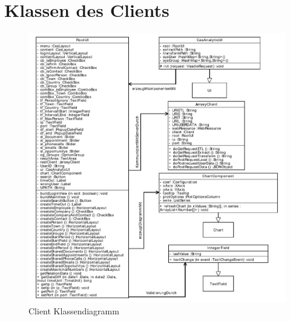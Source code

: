 \section{Klassen des Clients}

\begin{figure}[htbp]
\begin{center}
\includegraphics[width=1.0\textwidth]{pics/ClientKlassendiagramm.pdf}
\caption{Client Klassendiagramm}
\label{umsetzung_klassendiagramm_client}
\end{center}
\end{figure}